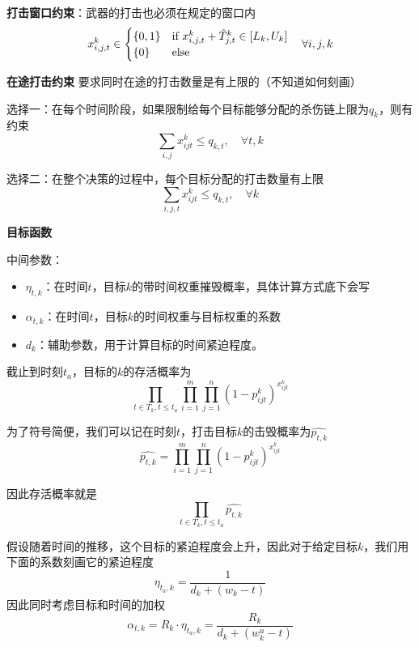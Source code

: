 \textbf{打击窗口约束}：武器的打击也必须在规定的窗口内
\begin{equation*}
    x_{i,j, t}^k \in \begin{cases} 
        \{0,1\} & \text{if } x_{i,j,t}^k + \hat{T}_{j,t}^k \in \left[ L_{k}, U_{k} \right]  \\
        \{0\} & \text{else}  
        \end{cases}\quad \forall i, j, k
\end{equation*}


\textbf{在途打击约束}
要求同时在途的打击数量是有上限的（不知道如何刻画）

选择一：在每个时间阶段，如果限制给每个目标能够分配的杀伤链上限为$q_k$，则有约束
\begin{equation*}
    \sum_{i,j} x_{ijt}^k \leq q_{k, t}, \quad \forall t, k
\end{equation*}

选择二：在整个决策的过程中，每个目标分配的打击数量有上限
\begin{equation*}
    \sum_{i,j,t} x_{ijt}^k \leq q_{k, t}, \quad \forall k
\end{equation*}

\textbf{目标函数}

中间参数：
\begin{itemize}
    \item $\eta_{t,k}$：在时间$t$，目标$k$的带时间权重摧毁概率，具体计算方式底下会写
    \item $\alpha_{t,k}$：在时间$t$，目标$k$的时间权重与目标权重的系数
    \item $d_k$：辅助参数，用于计算目标的时间紧迫程度。
\end{itemize}

截止到时刻$t_a$，目标的$k$的存活概率为
\begin{equation*}
    \prod_{t\in T_k, t \leq t_a}\prod_{i = 1}^{m}\prod_{j=1}^{n}(1-p_{ijt}^k)^{x_{ijt}^k}
\end{equation*}

为了符号简便，我们可以记在时刻$t$，打击目标$k$的击毁概率为$\hat{p_{t,k}}$
\begin{equation*}
    \hat{p_{t,k}} = \prod_{i = 1}^{m}\prod_{j=1}^{n}(1-p_{ijt}^k)^{x_{ijt}^k}
\end{equation*}

因此存活概率就是
\begin{equation*}
    \prod_{t\in T_k, t \leq t_a}\hat{p_{t,k}}
\end{equation*}


假设随着时间的推移，这个目标的紧迫程度会上升，因此对于给定目标$k$，我们用下面的系数刻画它的紧迫程度
\begin{equation*}
    \eta_{t_a,k} = \frac{1}{d_k + (w_k - t)}
\end{equation*}
因此同时考虑目标和时间的加权
\begin{equation*}
    \alpha_{t,k} = R_k \cdot \eta_{t_a,k} = \frac{R_k}{d_k + (w_k^u - t)}
\end{equation*}


